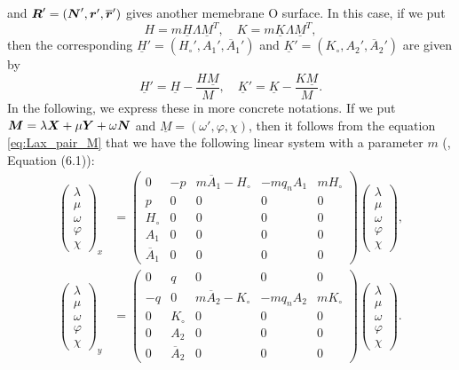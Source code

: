 \documentclass[a4paper]{amsart}
\def\br{\mbox{\boldmath $r$}}
\def\bH{\underline{H}}
\def\bK{\underline{K}}
\def\bM{\mbox{\boldmath $M$}}
\def\uM{\underline{M}}
\def\bN{\mbox{\boldmath $N$}}
\def\bR{\mbox{\boldmath $R$}}
\def\bX{\mbox{\boldmath $X$}}
\def\bY{\mbox{\boldmath $Y$}}
\theoremstyle{definition}
\begin{document}
and $\bR' = (\bN', \br', \overline{\br}')$ gives another memebrane O surface.
In this case, if we put
\begin{equation}
\label{eq:Backlund_aux_HK}
H = m \bH \Lambda \uM^T, \quad
K = m \bK \Lambda \uM^T,
\end{equation}
then the corresponding $\bH' = (H_\circ', A_1', \overline{A}_1')$ and $\bK' = (K_\circ, A_2', \overline{A}_2')$ are given by
\begin{equation}
\label{eq:Backlund_HK}
\bH' = \bH - \frac{H\uM}{M}, \quad
\bK' = \bK - \frac{K\uM}{M}.
\end{equation}
In the following, we express these in more concrete notations.
If we put $\bM = \lambda \bX + \mu \bY + \omega \bN$ and $\uM = (\omega', \varphi, \chi)$, then it follows from the equation \eqref{eq:Lax_pair_M} that we have the following linear system with a parameter $m$ (\cite{RogersSchief}, Equation (6.1)):
\begin{equation}
\label{eq:Lax_pair}
\begin{aligned}
\begin{pmatrix}
\lambda \\
\mu \\
\omega \\
\varphi \\
\chi
\end{pmatrix}_x &=
\begin{pmatrix}
0 & -p & m \overline{A}_1 - H_\circ & - m q_n A_1 & m H_\circ \\
p & 0 & 0 & 0 & 0 \\
H_\circ & 0 & 0 & 0 & 0 \\
A_1 & 0 & 0 & 0 & 0 \\
\overline{A}_1 & 0 & 0 & 0 & 0
\end{pmatrix}
\begin{pmatrix}
\lambda \\
\mu \\
\omega \\
\varphi \\
\chi
\end{pmatrix}, \\
%
\begin{pmatrix}
\lambda \\
\mu \\
\omega \\
\varphi \\
\chi
\end{pmatrix}_y &=
\begin{pmatrix}
0 & q & 0 & 0 & 0 \\
-q & 0 & m \overline{A}_2 - K_\circ & - m q_n A_2 & m K_\circ \\
0 & K_\circ & 0 & 0 & 0 \\
0 & A_2 & 0 & 0 & 0 \\
0 & \overline{A}_2 & 0 & 0 & 0
\end{pmatrix}
\begin{pmatrix}
\lambda \\
\mu \\
\omega \\
\varphi \\
\chi
\end{pmatrix}.
\end{aligned}
\end{equation}
\end{document}

